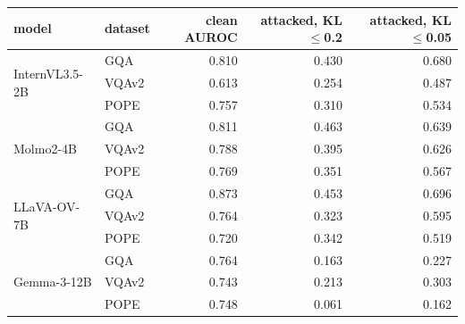 \small
\setlength{\tabcolsep}{6pt}
\begin{tabular}{@{}llrrr@{}}
\toprule
model & dataset & clean AUROC & attacked, KL$\le$0.2 & attacked, KL$\le$0.05 \\
\midrule
\multirow{3}{*}{InternVL3.5-2B} & GQA & 0.810 & 0.430 & 0.680 \\
 & VQAv2 & 0.613 & 0.254 & 0.487 \\
 & POPE & 0.757 & 0.310 & 0.534 \\
\midrule
\multirow{3}{*}{Molmo2-4B} & GQA & 0.811 & 0.463 & 0.639 \\
 & VQAv2 & 0.788 & 0.395 & 0.626 \\
 & POPE & 0.769 & 0.351 & 0.567 \\
\midrule
\multirow{3}{*}{LLaVA-OV-7B} & GQA & 0.873 & 0.453 & 0.696 \\
 & VQAv2 & 0.764 & 0.323 & 0.595 \\
 & POPE & 0.720 & 0.342 & 0.519 \\
\midrule
\multirow{3}{*}{Gemma-3-12B} & GQA & 0.764 & 0.163 & 0.227 \\
 & VQAv2 & 0.743 & 0.213 & 0.303 \\
 & POPE & 0.748 & 0.061 & 0.162 \\
\bottomrule
\end{tabular}
